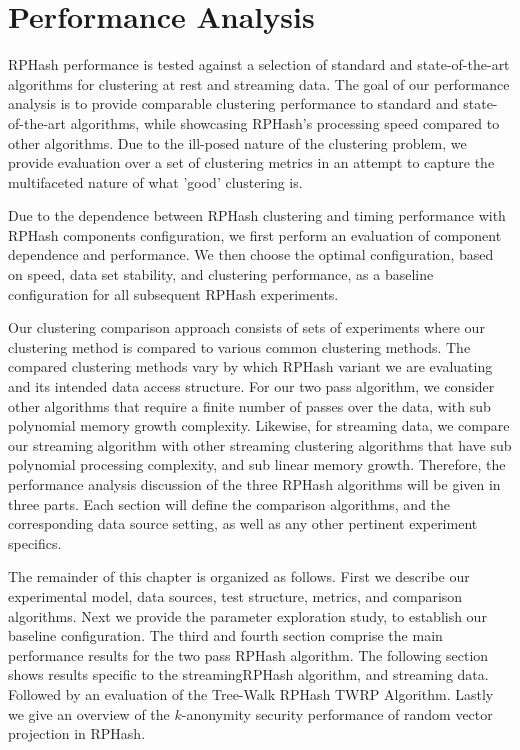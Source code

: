 
\chapter{Performance Analysis}\label{performance}

\textsf{RPHash} performance is tested against a selection of standard and state-of-the-art algorithms for
clustering at rest and streaming data.  The goal of our performance analysis is to provide
comparable clustering performance to standard and state-of-the-art algorithms, while showcasing
\textsf{RPHash}'s processing speed compared to other algorithms.  Due to the ill-posed nature of the
clustering problem, we provide evaluation over a set of clustering metrics in an attempt to capture
the multifaceted nature of what 'good' clustering is.

Due to the dependence between \textsf{RPHash} clustering and timing performance with \textsf{RPHash} components
configuration, we first perform an evaluation of component dependence and performance.  We then
choose the optimal configuration, based on speed, data set stability, and clustering performance, as
a baseline configuration for all subsequent \textsf{RPHash} experiments.

Our clustering comparison approach consists of sets of experiments where our clustering method is
compared to various common clustering methods.  The compared clustering methods vary by which \textsf{RPHash}
variant we are evaluating and its intended data access structure.  For our two pass algorithm, we
consider other algorithms that require a finite number of passes over the data, with sub polynomial
memory growth complexity.  Likewise, for streaming data, we compare our streaming algorithm with
other streaming clustering algorithms that have sub polynomial processing complexity, and sub linear
memory growth.  Therefore, the performance analysis discussion of the three \textsf{RPHash} algorithms will
be given in three parts.  Each section will define the comparison algorithms, and the corresponding
data source setting, as well as any other pertinent experiment specifics.

The remainder of this chapter is organized as follows.  First we describe our experimental model,
data sources, test structure, metrics, and comparison algorithms.  Next we provide the parameter
exploration study, to establish our baseline configuration.  The third and fourth section comprise
the main performance results for the two pass \textsf{RPHash} algorithm.  The following section shows results
specific to the \textsf{streamingRPHash} algorithm, and streaming data.  Followed by an evaluation
of the Tree-Walk RPHash \textsf{TWRP} Algorithm.  Lastly we give an overview of the $k$-anonymity security
performance of random vector projection in \textsf{RPHash}.

